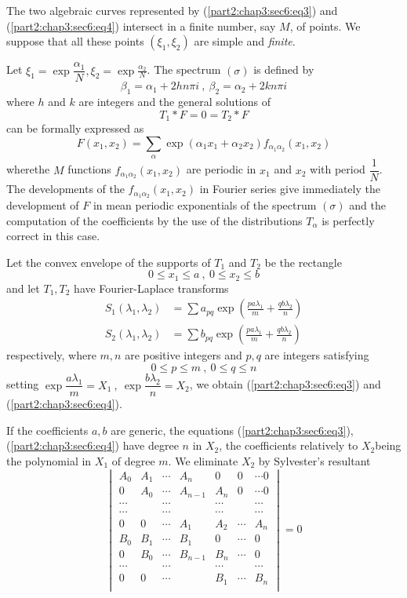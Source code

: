 The two algebraic curves represented by (\ref{part2:chap3:sec6:eq3})
and (\ref{part2:chap3:sec6:eq4}) intersect in a
finite number, say $M$, of points. We suppose that all these points
$(\xi_1, \xi_2)$ are simple and \textit{finite}. 

Let $\xi_1 = \exp \dfrac{ \alpha_1}{N}, \xi_2 = \exp
\frac{\alpha_2}{N}$. The spectrum $(\sigma )$ is defined by 
$$
\beta_1 = \alpha_1 + 2 hn \pi i ~,  ~ \beta_2 = \alpha_2 + 2kn \pi i
$$
where $h$ and $k$ are integers and the general solutions of 
$$
T_1 * F = 0 = T_2 * F
$$
can be formally expressed as 
$$
F(x_1,  x_2 ) = \sum_{\alpha} \exp (\alpha_1 x_1 + \alpha_2 x_2)
f_{\alpha_1 \alpha_2} (x_1,  x_2 ) 
$$
where\pageoriginale the $M$ functions $f_{\alpha_1 \alpha_2} (x_1,  x_2)$ are
periodic in $x_1$ and $x_2$ with period $\dfrac{1}{N}$. The
developments of the $f_{\alpha_1 \alpha_2} (x_1,  x_2)$ in Fourier
series give immediately the development of $F$ in mean periodic
exponentials of the spectrum $(\sigma )$ and the computation of the
coefficients by the use of the distributions $T_\alpha$ is perfectly
correct in this case. 

Let the convex envelope of the supports of $T_1$ and $T_2$ be the rectangle
$$
0 \leq x_1 \leq a ~,  ~ 0 \leq x_2 \leq b
$$
and let $T_1,  T_2$ have Fourier-Laplace transforms
\begin{align*}
  S_1(\lambda_1,  \lambda_2) & = \sum a_{pq} \exp \left(\frac{p a \lambda_1
  }{m} + \frac{q b \lambda_2}{n}\right)
  \tag*{$(1)'$}\label{part2:chap3:sec6:eq1'}\\  
  S_2(\lambda_1,  \lambda_2) & = \sum b_{pq} \exp \left(\frac{p a
    \lambda_1}{m}+ \frac{q b \lambda_2}{n}\right)
  \tag*{$(2)'$}\label{part2:chap3:sec6:eq2'}  
\end{align*}
respectively, where $m,  n$ are positive integers and $p, q$ are
integers satisfying 
$$
0 \leq p \leq m ~,  ~ 0 \leq q \leq n 
$$
setting $\exp \dfrac{a \lambda_1} {m} = X_1 ~,  ~ \exp \dfrac{b
  \lambda_2}{n} = X_2$, we obtain (\ref{part2:chap3:sec6:eq3}) and
(\ref{part2:chap3:sec6:eq4}). 

If the coefficients $a, b$ are generic, the equations
(\ref{part2:chap3:sec6:eq3}), (\ref{part2:chap3:sec6:eq4}) have 
degree $n$ in $X_2$, the coefficients relatively to  $X_2$\pageoriginale being the
polynomial in $X_1$ of degree $m$. We eliminate $X_2$ by Sylvester's
resultant 
$$
\begin{vmatrix}
  A_0 & A_1 & \cdots & A_n & 0 & 0 & \cdots  0\\
  0 & A_0 & \cdots & A_{n-1} & A_n & 0 & \cdots  0\\
  \cdots & & \cdots & & \cdots & & \cdots\\
  \cdots & & \cdots & & \cdots & & \cdots\\
  0 & 0 & \cdots & A_1 & A_2 & \cdots & A_n\\
  B_0 & B_1 & \cdots & B_1 & 0 & \cdots & 0\\
  0 & B_0 & \cdots & B_{n-1} &B_n & \cdots & 0\\
  \cdots & & \cdots & & \cdots & & \cdots\\
  0 & 0 & \cdots &  &B_1 & \cdots & B_n\\
\end{vmatrix} = 0
$$

